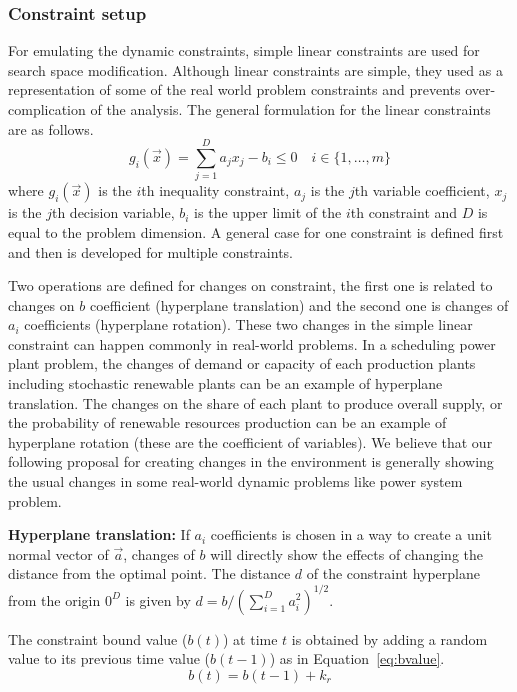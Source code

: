\documentclass[review]{elsarticle}
\begin{document}
\subsubsection{Constraint setup}
For emulating the dynamic constraints, simple linear constraints are used for search space modification. Although linear constraints are simple, they used as a representation of some of the real world problem constraints and prevents over-complication of the analysis. The general formulation for the linear constraints are as follows. 
 \begin{equation}
g_i(\vec{x})=\sum\limits_{j=1}^{D} a_j x_j-b_i \le 0 \quad  i \in\{ 1, \ldots, m\} 
 \end{equation}
where $g_i(\vec{x})$ is the $i$th inequality constraint, $a_j$ is the $j$th variable coefficient, $x_j$ is the $j$th decision variable, $b_i$ is the upper limit of the $i$th  constraint and $D$ is equal to the problem dimension.
A general case for one constraint is defined first and then is developed for multiple constraints. 

Two operations are defined for changes on constraint, the first one is related to changes on $b$ coefficient (hyperplane translation) and the second one is changes of $a_i$ coefficients (hyperplane rotation). 
These two changes in the simple linear constraint can happen commonly in real-world problems. In a scheduling power plant problem, the changes of demand or capacity of each production plants including stochastic renewable plants can be an example of hyperplane translation. The changes on the share of each plant to produce overall supply, or the probability of renewable resources production can be an example of hyperplane rotation (these are the coefficient of variables). We believe that our following proposal for creating changes in the environment is generally showing the usual changes in some real-world dynamic problems like power system problem. 
 
\textbf{Hyperplane translation:}
If $a_i$ coefficients is chosen in a way to create a unit normal vector of $\vec{a}$, changes of $b$ will directly show the effects of changing the distance from the optimal point. The distance $d$ of the constraint hyperplane from the origin $0^D$ is given by
$	d=b/\left(\sum\limits_{i=1}^{D} a_i^{2}\right)^{1/2}.$

The constraint bound value ($b(t)$) at time $t$ is obtained by adding a random value to its previous time value ($b(t-1)$) as in Equation~\ref{eq:bvalue}.  
\begin{equation}
\label{eq:bvalue}
	b(t)=b(t-1)+k_{r}
\end{equation}
\end{document}
